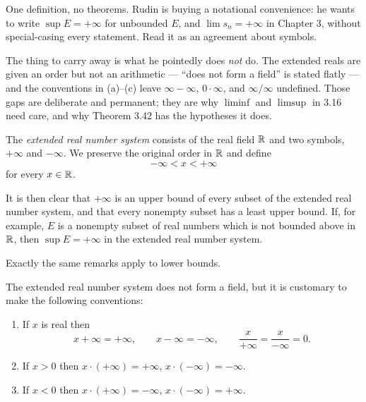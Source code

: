 
\begin{signpost}
One definition, no theorems. Rudin is buying a notational convenience: he wants
to write $\sup E = +\infty$ for unbounded $E$, and $\lim s_n = +\infty$ in
Chapter 3, without special-casing every statement. Read it as an agreement about
symbols.

\smallskip
The thing to carry away is what he pointedly does \emph{not} do. The extended
reals are given an order but not an arithmetic --- ``does not form a field'' is
stated flatly --- and the conventions in (a)--(c) leave $\infty - \infty$,
$0 \cdot \infty$, and $\infty/\infty$ undefined. Those gaps are deliberate and
permanent; they are why $\liminf$ and $\limsup$ in 3.16 need care, and why
Theorem 3.42 has the hypotheses it does.
\end{signpost}

The \emph{extended real number system} consists of the real field $\mathbb{R}$ and two
symbols, $+\infty$ and $-\infty$. We preserve the original order in $\mathbb{R}$ and
define
\[ -\infty < x < +\infty \]
for every $x \in \mathbb{R}$.

It is then clear that $+\infty$ is an upper bound of every subset of the
extended real number system, and that every nonempty subset has a least upper
bound. If,
for example, $E$ is a nonempty subset of real numbers which is not bounded above
in $\mathbb{R}$, then $\sup E = +\infty$ in the extended real number system.

Exactly the same remarks apply to lower bounds.

The extended real number system does not form a field, but it is customary to
make the following conventions:
\begin{enumerate}[label=(\alph*), leftmargin=2.2em, itemsep=3pt, topsep=4pt]
  \item If $x$ is real then
        \[ x + \infty = +\infty, \qquad x - \infty = -\infty, \qquad
           \frac{x}{+\infty} = \frac{x}{-\infty} = 0. \]
  \item If $x > 0$ then $x \cdot (+\infty) = +\infty$,
        $x \cdot (-\infty) = -\infty$.
  \item If $x < 0$ then $x \cdot (+\infty) = -\infty$,
        $x \cdot (-\infty) = +\infty$.
\end{enumerate}

